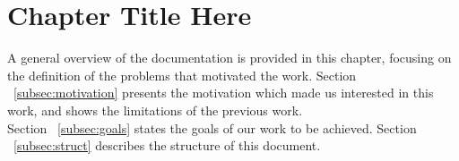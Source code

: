 
\chapter{Chapter Title Here} %

\label{Chapter3} %


A general overview of the documentation is provided in this chapter, focusing on the definition of the problems that motivated the work. Section ~\ref{subsec:motivation} presents the motivation which made us interested in this work, and shows the limitations of the previous work.\\
Section ~\ref{subsec:goals} states the goals of our work to be achieved. Section ~\ref{subsec:struct} describes the structure of this document.

